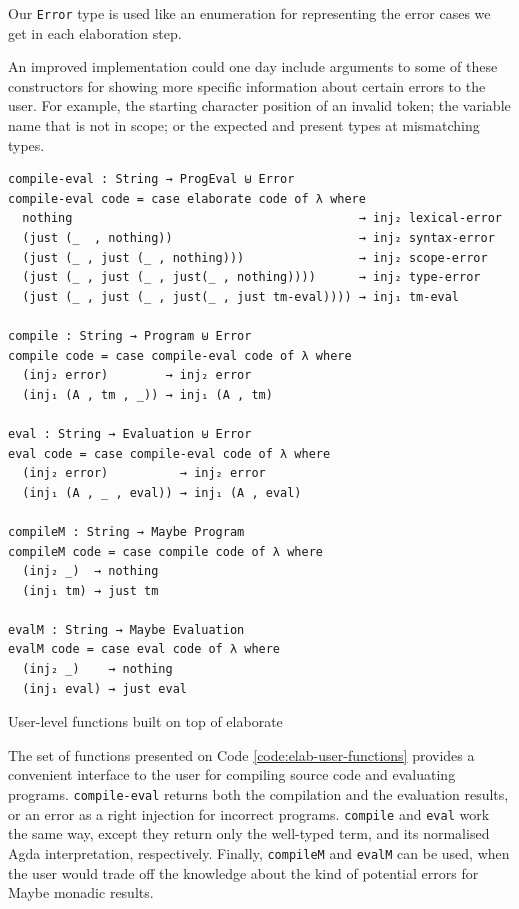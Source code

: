 Our \verb$Error$ type is used like an enumeration for representing the error cases we get in each elaboration step.

An improved implementation could one day include arguments to some of these constructors for showing more specific information about certain errors to the user. For example, the starting character position of an invalid token; the variable name that is not in scope; or the expected and present types at mismatching types.

\begin{listing}[H]
\begin{verbatim}
compile-eval : String → ProgEval ⊎ Error
compile-eval code = case elaborate code of λ where
  nothing                                        → inj₂ lexical-error
  (just (_  , nothing))                          → inj₂ syntax-error
  (just (_ , just (_ , nothing)))                → inj₂ scope-error
  (just (_ , just (_ , just(_ , nothing))))      → inj₂ type-error
  (just (_ , just (_ , just(_ , just tm-eval)))) → inj₁ tm-eval

compile : String → Program ⊎ Error
compile code = case compile-eval code of λ where
  (inj₂ error)        → inj₂ error
  (inj₁ (A , tm , _)) → inj₁ (A , tm)

eval : String → Evaluation ⊎ Error
eval code = case compile-eval code of λ where
  (inj₂ error)          → inj₂ error
  (inj₁ (A , _ , eval)) → inj₁ (A , eval)

compileM : String → Maybe Program
compileM code = case compile code of λ where
  (inj₂ _)  → nothing
  (inj₁ tm) → just tm

evalM : String → Maybe Evaluation
evalM code = case eval code of λ where
  (inj₂ _)    → nothing
  (inj₁ eval) → just eval
\end{verbatim}
\caption{User-level functions built on top of elaborate}
\label{code:elab-user-functions}
\end{listing}

The set of functions presented on Code \ref{code:elab-user-functions} provides a convenient interface to the user for compiling source code and evaluating programs. \verb$compile-eval$ returns both the compilation and the evaluation results, or an error as a right injection for incorrect programs. \verb$compile$ and \verb$eval$ work the same way, except they return only the well-typed term, and its normalised Agda interpretation, respectively. Finally, \verb$compileM$ and \verb$evalM$ can be used, when the user would trade off the knowledge about the kind of potential errors for Maybe monadic results.

